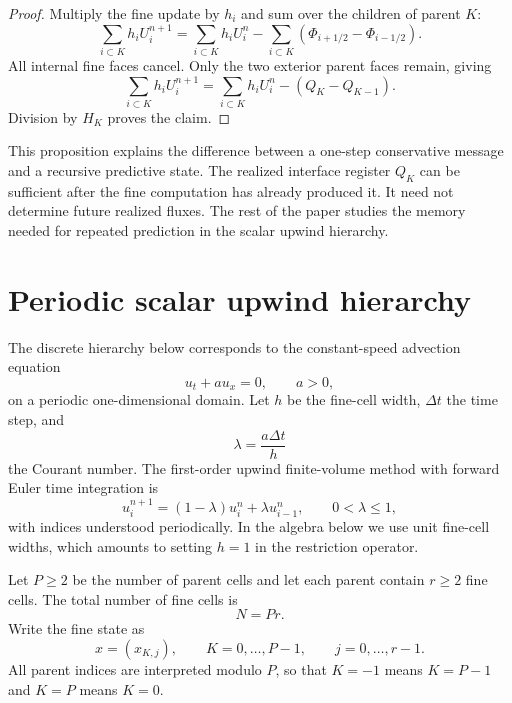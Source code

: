 \documentclass[preprint,12pt]{elsarticle}
\theoremstyle{plain}
\theoremstyle{remark}
\theoremstyle{definition}
\begin{document}
\begin{proof}
Multiply the fine update by \(h_i\) and sum over the children of parent
\(K\):
\[
  \sum_{i\subset K}h_i U_i^{n+1}
  =
  \sum_{i\subset K}h_i U_i^n
  -
  \sum_{i\subset K}(\Phi_{i+1/2}-\Phi_{i-1/2}).
\]
All internal fine faces cancel. Only the two exterior parent faces remain, giving
\[
  \sum_{i\subset K}h_i U_i^{n+1}
  =
  \sum_{i\subset K}h_i U_i^n
  -
  (Q_K-Q_{K-1}).
\]
Division by \(H_K\) proves the claim.
\end{proof}

This proposition explains the difference between a one-step conservative
message and a recursive predictive state.  The realized interface register \(Q_K\) can be
sufficient after the fine computation has already produced it.  It need not
determine future realized fluxes.  The rest of the paper studies the memory
needed for repeated prediction in the scalar upwind hierarchy.

\section{Periodic scalar upwind hierarchy} \label{sec:periodic}

The discrete hierarchy below corresponds to the constant-speed advection
equation
\[
  u_t+a u_x=0,
  \qquad a>0,
\]
on a periodic one-dimensional domain.  Let \(h\) be the fine-cell width,
\(\Delta t\) the time step, and
\[
  \lambda=\frac{a\Delta t}{h}
\]
the Courant number.  The first-order upwind finite-volume method with
forward Euler time integration is
\[
  u_i^{n+1}
  =
  (1-\lambda)u_i^n+\lambda u_{i-1}^n,
  \qquad 0<\lambda\le1,
\]
with indices understood periodically.  In the algebra below we use unit
fine-cell widths, which amounts to setting \(h=1\) in the restriction
operator.

Let \(P\ge2\) be the number of parent cells and let each parent contain
\(r\ge2\) fine cells.  The total number of fine cells is
\[
  N=Pr.
\]
Write the fine state as
\[
  x=(x_{K,j}),
  \qquad
  K=0,\ldots,P-1,
  \qquad
  j=0,\ldots,r-1.
\]
All parent indices are interpreted modulo \(P\), so that \(K=-1\) means
\(K=P-1\) and \(K=P\) means \(K=0\).
\end{document}
